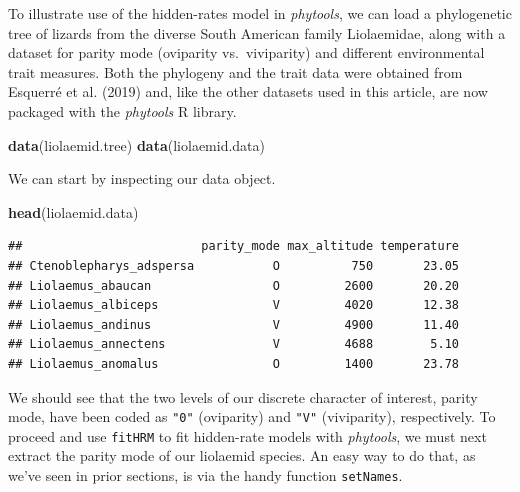 \documentclass[fleqn,10pt,lineno]{wlpeerj} %
\newenvironment{Shaded}{\begin{snugshade}}{\end{snugshade}}
\newcommand{\FunctionTok}[1]{\textcolor[rgb]{0.13,0.29,0.53}{\textbf{#1}}}
\newcommand{\NormalTok}[1]{#1}
\newcommand{\OtherTok}[1]{\textcolor[rgb]{0.56,0.35,0.01}{#1}}
\newcommand{\SpecialCharTok}[1]{\textcolor[rgb]{0.81,0.36,0.00}{\textbf{#1}}}
\begin{document}
To illustrate use of the hidden-rates model in \emph{phytools}, we can load a phylogenetic tree of lizards from the diverse South American family Liolaemidae, along with a dataset for parity mode (oviparity vs.~viviparity) and different environmental trait measures. Both the phylogeny and the trait data were obtained from Esquerré et al. (2019) and, like the other datasets used in this article, are now packaged with the \emph{phytools} R library.

\begin{Shaded}
\begin{Highlighting}[]
\FunctionTok{data}\NormalTok{(liolaemid.tree)}
\FunctionTok{data}\NormalTok{(liolaemid.data)}
\end{Highlighting}
\end{Shaded}

We can start by inspecting our data object.

\begin{Shaded}
\begin{Highlighting}[]
\FunctionTok{head}\NormalTok{(liolaemid.data)}
\end{Highlighting}
\end{Shaded}

\begin{verbatim}
##                         parity_mode max_altitude temperature
## Ctenoblepharys_adspersa           O          750       23.05
## Liolaemus_abaucan                 O         2600       20.20
## Liolaemus_albiceps                V         4020       12.38
## Liolaemus_andinus                 V         4900       11.40
## Liolaemus_annectens               V         4688        5.10
## Liolaemus_anomalus                O         1400       23.78
\end{verbatim}

We should see that the two levels of our discrete character of interest, parity mode, have been coded as \texttt{"0"} (oviparity) and \texttt{"V"} (viviparity), respectively. To proceed and use \texttt{fitHRM} to fit hidden-rate models with \emph{phytools}, we must next extract the parity mode of our liolaemid species. An easy way to do that, as we've seen in prior sections, is via the handy function \texttt{setNames}.

\begin{Shaded}
\end{Shaded}
\end{document}
